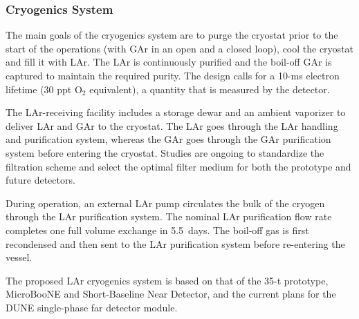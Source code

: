 \subsubsection{Cryogenics System}

The main goals of the cryogenics system are to purge the cryostat
prior to the start of the operations (with GAr in an open and a closed
loop),  cool the cryostat and fill it
with LAr.  The LAr is continuously purified and the boil-off GAr is
captured to maintain the required purity.
The design calls for a 10-ms electron lifetime (30 ppt
O$_2$ equivalent), a quantity that is measured by the detector.

The LAr-receiving facility includes a storage dewar and an ambient
vaporizer to deliver LAr and GAr to the cryostat. The LAr goes through
the LAr handling and purification system, whereas the GAr goes through
the GAr purification system before entering the cryostat.  Studies are
ongoing to standardize the filtration scheme and select the optimal
filter medium for both the prototype and future detectors.

During operation, an external LAr pump circulates the bulk of the
cryogen through the LAr purification system. The nominal LAr
purification flow rate completes one full volume exchange in 5.5~days.
The boil-off gas is first recondensed and then sent to the LAr
purification system before re-entering the vessel.

The proposed LAr cryogenics system is based on that of the 35-t
prototype, MicroBooNE and Short-Baseline Near Detector,
and the current plans for the DUNE single-phase far detector module.
